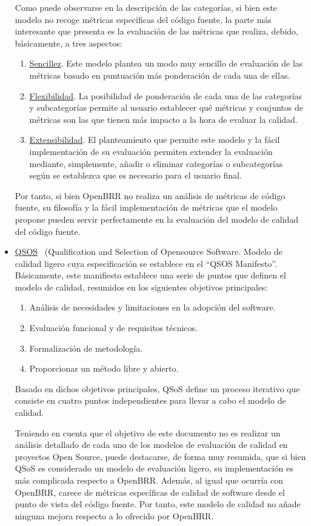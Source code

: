 \documentclass[11pt]{article}
\begin{document}
\begin{itemize}
Como puede observarse en la descripción de las categorías, si bien este modelo no recoge métricas específicas del código fuente, la parte más interesante que presenta es la evaluación de las métricas que realiza, debido, básicamente, a tres aspectos:
\begin{enumerate}
\item{\underline{Sencillez}}. Este modelo plantea un modo muy sencillo de evaluación de las métricas basado en puntuación más ponderación de cada una de ellas.
\item{\underline{Flexibilidad}}. La posibilidad de ponderación de cada una de las categorías y subcategorías permite al usuario establecer qué métricas y conjuntos de métricas son las que tienen más impacto a la hora de evaluar la calidad.
\item{\underline{Extensibilidad}}. El planteamiento que permite este modelo y la fácil implementación de su evaluación permiten extender la evaluación mediante, simplemente, añadir o eliminar categorías o subcategorías según se establezca que es necesario para el usuario final.
\end{enumerate}

Por tanto, si bien OpenBRR no realiza un análisis de métricas de código fuente, su filosofía y la fácil implementación de métricas que el modelo propone pueden servir perfectamente en la evaluación del modelo de calidad del código fuente.

\item{\underline{QSOS}~\cite{qsos:qsos} (Qualification and Selection of Opensource Software}. Modelo de calidad ligero cuya especificación se establece en el ``QSOS Manifesto''. Básicamente, este manifiesto establece una serie de puntos que definen el modelo de calidad, resumidos en los siguientes objetivos principales:
\begin{enumerate}
\item{Análisis de necesidades y limitaciones en la adopción del software}.
\item{Evaluación funcional y de requisitos técnicos}.
\item{Formalización de metodología}.
\item{Proporcionar un método libre y abierto}.
\end{enumerate}
Basado en dichos objetivos principales, QSoS define un proceso iterativo que consiste en cuatro puntos independientes para llevar a cabo el modelo de calidad.

Teniendo en cuenta que el objetivo de este documento no es realizar un análisis detallado de cada uno de los modelos de evaluación de calidad en proyectos Open Source, puede destacarse, de forma muy resumida, que si bien QSoS es considerado un modelo de evaluación ligero, su implementación es más complicada respecto a OpenBRR. Además, al igual que ocurría con OpenBRR, carece de métricas específicas de calidad de software desde el punto de vista del código fuente. Por tanto, este modelo de calidad no añade ninguna mejora respecto a lo ofrecido por OpenBRR.
\end{itemize}
\end{document}
